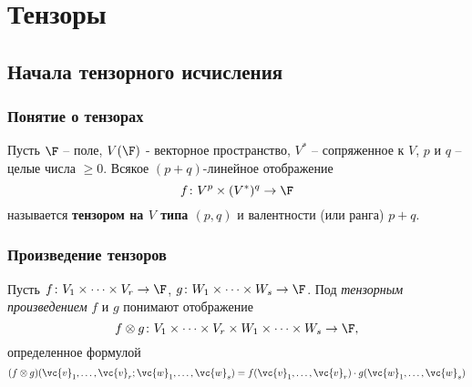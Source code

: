 \section{Тензоры}
\subsection{Начала тензорного исчисления}
\subsubsection{Понятие о тензорах}
\begin{to_def}
    Пусть $\F$ -- поле, $V(\F)$ - векторное пространство, $V^*$ -- сопряженное к $V$, $p$ и $q$ -- целые числа $\geqslant 0$. Всякое $(p+q)$-линейное отображение 
    \begin{equation}
        f \colon V^p \times (V^*)^q \to \F
    \end{equation}
    называется \textbf{тензором на $V$ типа $(p, q)$} и валентности (или ранга) $p+q$.
\end{to_def}


\subsubsection{Произведение тензоров}

\begin{to_def}
    Пусть $f \colon V_1 \times \dots \times V_r \to \F$, $g \colon W_1 \times \dots \times W_s \to \F$.
    Под \textit{тензорным произведением} $f$ и $g$ понимают отображение
    \begin{equation}
        f \otimes g \colon V_1 \times \dots \times V_r \times W_1 \times \dots \times W_s \to \F,
    \end{equation}
    определенное формулой
    \begin{equation}
        (f \otimes g)(\vc{v}_1, \dots, \vc{v}_r; \vc{w}_1, \dots, \vc{w}_s) = f(\vc{v}_1, \dots, \vc{v}_r) \cdot g(\vc{w}_1, \dots, \vc{w}_s)
    \end{equation}
\end{to_def}


